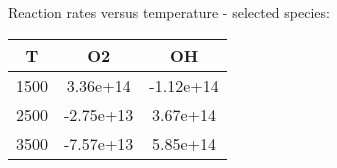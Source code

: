 \documentclass[11pt,letter]{article}
\begin{document}
Reaction rates versus temperature - selected species:\begin{table}[h]
\begin{tabular}{c|c|c}
\hline
T & O2 & OH\\
\hline
1500 & 3.36e+14 & -1.12e+14\\
\hline
2500 & -2.75e+13 & 3.67e+14\\
\hline
3500 & -7.57e+13 & 5.85e+14\\
\end{tabular}
\end{table}
\end{document}
